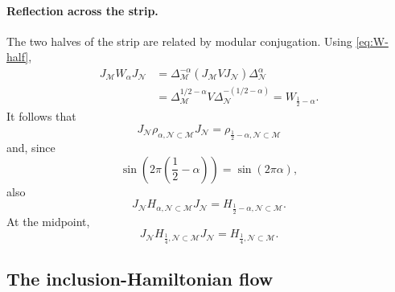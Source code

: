 \documentclass[a4paper,11pt]{article}
\theoremstyle{definition}
\newcommand{\mN}{\mathcal{N}}
\newcommand{\mM}{\mathcal{M}}
\begin{document}
\paragraph{Reflection across the strip.}
The two halves of the strip are related by modular conjugation. Using
\eqref{eq:W-half},
\begin{align}
    J_{\mM}W_\alpha J_{\mN}
    &=
    \Delta_{\mM}^{-\alpha}
    (J_{\mM}VJ_{\mN})
    \Delta_{\mN}^\alpha
    \nonumber\\
    &=
    \Delta_{\mM}^{1/2-\alpha}
    V
    \Delta_{\mN}^{-(1/2-\alpha)}
    =
    W_{\frac12-\alpha}.
    \label{eq:W-reflection}
\end{align}
It follows that
\begin{equation}
    \boxed{
    J_{\mN}
    \rho_{\alpha,\mN\subset\mM}
    J_{\mN}
    =
    \rho_{\frac12-\alpha,\mN\subset\mM}
    }
    \label{eq:rho-reflection}
\end{equation}
and, since
\begin{equation}
    \sin\left(2\pi\left(\frac12-\alpha\right)\right)
    =
    \sin(2\pi\alpha),
\end{equation}
also
\begin{equation}
    \boxed{
    J_{\mN}
    H_{\alpha,\mN\subset\mM}
    J_{\mN}
    =
    H_{\frac12-\alpha,\mN\subset\mM}.
    }
    \label{eq:H-reflection}
\end{equation}
At the midpoint,
\begin{equation}
    J_{\mN}
    H_{\frac14,\mN\subset\mM}
    J_{\mN}
    =
    H_{\frac14,\mN\subset\mM}.
    \label{eq:H-quarter-real}
\end{equation}

\subsection{The inclusion-Hamiltonian flow}
\end{document}
